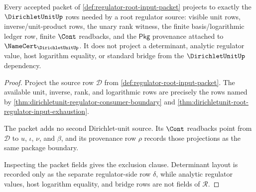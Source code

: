 \begin{theorem}
\label{thm:regulator-dirichletunit-input-boundary}
Every accepted packet of \autoref{def:regulator-root-input-packet} projects to
exactly the $\DirichletUnitUp$ rows needed by a root regulator source: visible
unit rows, inverse/unit-product rows, the unary rank witness, the finite
basis/logarithmic ledger row, finite $\Cont$ readbacks, and the $\mathsf{Pkg}$
provenance attached to $\NameCert_{\DirichletUnitUp}$. It does not project a
determinant, analytic regulator value, host logarithm equality, or standard
bridge from the $\DirichletUnitUp$ dependency.
\end{theorem}
\begin{proof}
Project the source row $\mathcal{D}$ from
\autoref{def:regulator-root-input-packet}. The available unit, inverse, rank,
and logarithmic rows are precisely the rows named by
\autoref{thm:dirichletunit-regulator-consumer-boundary} and
\autoref{thm:dirichletunit-root-regulator-input-exhaustion}.

The packet adds no second Dirichlet-unit source. Its $\Cont$ readbacks point
from $\mathcal{D}$ to $u$, $\iota$, $\nu$, and $\beta$, and its provenance row
$\rho$ records those projections as the same package boundary.

Inspecting the packet fields gives the exclusion clause. Determinant layout is
recorded only as the separate regulator-side row $\delta$, while analytic
regulator values, host logarithm equality, and bridge rows are not fields of
$\mathcal{R}$.
\end{proof}

